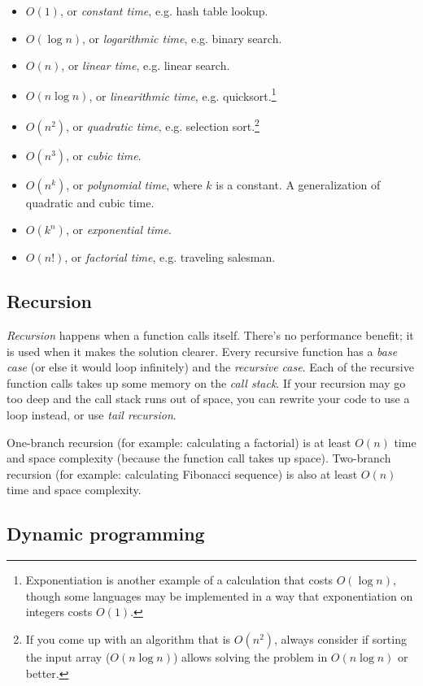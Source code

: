 \documentclass[table, xcdraw]{article}%
\begin{document}
\begin{itemize}
    \item $O(1)$, or \emph{constant time}, e.g. hash table lookup.
    \item $O(\log n)$, or \emph{logarithmic time}, e.g. binary search.
    \item $O(n)$, or \emph{linear time}, e.g. linear search.
    \item $O(n \log n)$, or \emph{linearithmic time}, e.g. quicksort.\footnote{Exponentiation is another example of a calculation that costs $O(\log n)$, though some languages may be implemented in a way that exponentiation on integers costs $O(1)$.}
    \item $O(n^2)$, or \emph{quadratic time}, e.g. selection sort.\footnote{If you come up with an algorithm that is $O(n^2)$, always consider if sorting the input array ($O(n \log n)$) allows solving the problem in $O(n \log n)$ or better.}
    \item $O(n^3)$, or \emph{cubic time}.
    \item $O(n^k)$, or \emph{polynomial time}, where $k$ is a constant. A generalization of quadratic and cubic time.
    \item $O(k^n)$, or \emph{exponential time}.
    \item $O(n!)$, or \emph{factorial time}, e.g. traveling salesman.
\end{itemize}

\subsection{Recursion}

\emph{Recursion} happens when a function calls itself. There’s no performance benefit; it is used when it makes the solution clearer. Every recursive function has a \emph{base case} (or else it would loop infinitely) and the \emph{recursive case}. Each of the recursive function calls takes up some memory on the \emph{call stack}. If your recursion may go too deep and the call stack runs out of space, you can rewrite your code to use a loop instead, or use \emph{tail recursion}.

One-branch recursion (for example: calculating a factorial) is at least $O(n)$ time and space complexity (because the function call takes up space). Two-branch recursion (for example: calculating Fibonacci sequence) is also at least $O(n)$ time and space complexity.

\subsection{Dynamic programming} \label{dynamic_programming}
\end{document}
